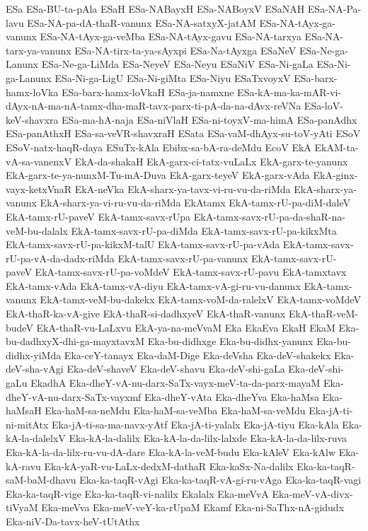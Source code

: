 {ESa
ESa-BU-ta-pAla
ESaH
ESa-NABayxH
ESa-NABoyxV
ESaNAH
ESa-NA-Pa-lavu
ESa-NA-pa-dA-thaR-vanunx
ESa-NA-satxyX-jatAM
ESa-NA-tAyx-ga-vanunx
ESa-NA-tAyx-ga-veMba
ESa-NA-tAyx-gavu
ESa-NA-tarxya
ESa-NA-tarx-ya-vanunx
ESa-NA-tirx-ta-ya-sAyxpi
ESa-Na-tAyxga
ESaNeV
ESa-Ne-ga-Lanunx
ESa-Ne-ga-LiMda
ESa-NeyeV
ESa-Neyu
ESaNiV
ESa-Ni-gaLa
ESa-Ni-ga-Lanunx
ESa-Ni-ga-LigU
ESa-Ni-giMta
ESa-Niyu
ESaTxvoyxV
ESa-barx-hamx-loVka
ESa-barx-hamx-loVkaH
ESa-ja-namxne
ESa-kA-ma-ka-mAR-vi-dAyx-nA-ma-nA-tamx-dha-maR-tavx-parx-ti-pA-da-na-dAvx-reVNa
ESa-loV-keV-shavxra
ESa-ma-hA-naja
ESa-niVlaH
ESa-ni-toyxV-ma-himA
ESa-panAdhx
ESa-panAthxH
ESa-sa-veVR-shavxraH
ESata
ESa-vaM-dhAyx-su-toV-yAti
ESoV
ESoV-natx-haqR-daya
ESuTx-kAla
Ebibx-sa-bA-ra-deMdu
EcoV
EkA
EkAM-ta-vA-sa-vanenxV
EkA-da-shakaH
EkA-garx-ci-tatx-vuLaLx
EkA-garx-te-yanunx
EkA-garx-te-ya-nunxM-Tu-mA-Duva
EkA-garx-teyeV
EkA-garx-vAda
EkA-ginx-vayx-ketxVnaR
EkA-neVka
EkA-sharx-ya-tavx-vi-ru-vu-da-riMda
EkA-sharx-ya-vanunx
EkA-sharx-ya-vi-ru-vu-da-riMda
EkAtamx
EkA-tamx-rU-pa-diM-daleV
EkA-tamx-rU-paveV
EkA-tamx-savx-rUpa
EkA-tamx-savx-rU-pa-da-shaR-na-veM-bu-dalalx
EkA-tamx-savx-rU-pa-diMda
EkA-tamx-savx-rU-pa-kikxMta
EkA-tamx-savx-rU-pa-kikxM-talU
EkA-tamx-savx-rU-pa-vAda
EkA-tamx-savx-rU-pa-vA-da-dadx-riMda
EkA-tamx-savx-rU-pa-vanunx
EkA-tamx-savx-rU-paveV
EkA-tamx-savx-rU-pa-voMdeV
EkA-tamx-savx-rU-pavu
EkA-tamxtavx
EkA-tamx-vAda
EkA-tamx-vA-diyu
EkA-tamx-vA-gi-ru-vu-danunx
EkA-tamx-vanunx
EkA-tamx-veM-bu-dakekx
EkA-tamx-voM-da-ralelxV
EkA-tamx-voMdeV
EkA-thaR-ka-vA-give
EkA-thaR-si-dadhxyeV
EkA-thaR-vanunx
EkA-thaR-veM-budeV
EkA-thaR-vu-LaLxvu
EkA-ya-na-meVvaM
Eka
EkaEva
EkaH
EkaM
Eka-bu-dadhxyX-dhi-ga-mayxtavxM
Eka-bu-didhxge
Eka-bu-didhx-yanunx
Eka-bu-didhx-yiMda
Eka-ceY-tanayx
Eka-daM-Dige
Eka-deVsha
Eka-deV-shakekx
Eka-deV-sha-vAgi
Eka-deV-shaveV
Eka-deV-shavu
Eka-deV-shi-gaLa
Eka-deV-shi-gaLu
EkadhA
Eka-dheY-vA-nu-darx-SaTx-vayx-meV-ta-da-parx-mayaM
Eka-dheY-vA-nu-darx-SaTx-vayxmf
Eka-dheY-vAta
Eka-dheYva
Eka-haMsa
Eka-haMsaH
Eka-haM-sa-neMdu
Eka-haM-sa-veMba
Eka-haM-sa-veMdu
Eka-jA-ti-ni-mitAtx
Eka-jA-ti-sa-ma-navx-yAtf
Eka-jA-ti-yalalx
Eka-jA-tiyu
Eka-kAla
Eka-kA-la-dalelxV
Eka-kA-la-dalilx
Eka-kA-la-da-lilx-lalxde
Eka-kA-la-da-lilx-ruva
Eka-kA-la-da-lilx-ru-vu-dA-dare
Eka-kA-la-veM-budu
Eka-kAleV
Eka-kAlw
Eka-kA-ravu
Eka-kA-yaR-vu-LaLx-dedxM-dathaR
Eka-kaSx-Na-dalilx
Eka-ka-taqR-saM-baM-dhavu
Eka-ka-taqR-vAgi
Eka-ka-taqR-vA-gi-ru-vAga
Eka-ka-taqR-vagi
Eka-ka-taqR-vige
Eka-ka-taqR-vi-nalilx
Ekalalx
Eka-meVvA
Eka-meV-vA-divx-tiVyaM
Eka-meVva
Eka-meV-veY-ka-rUpaM
Ekamf
Eka-ni-SaThx-nA-gidudx
Eka-niV-Da-tavx-heV-tUtAthx
}
